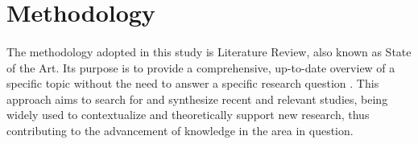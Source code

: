 \section{Methodology}
\sloppy
\paragraph{}
The methodology adopted in this study is Literature Review, also known as State of the Art. Its purpose is to provide a comprehensive, up-to-date overview of a specific topic without the need to answer a specific research question \cite{ridley2012literature}. This approach aims to search for and synthesize recent and relevant studies, being widely used to contextualize and theoretically support new research, thus contributing to the advancement of knowledge in the area in question.

